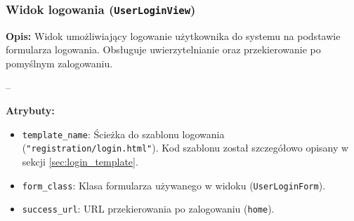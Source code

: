 \documentclass[12pt,a4paper,oneside]{article}
\theoremstyle{definition}
\numberwithin{equation}{section}
\begin{document}
\subsubsection*{Widok logowania (\texttt{UserLoginView})}

\textbf{Opis:}  
Widok umożliwiający logowanie użytkownika do systemu na podstawie formularza logowania. Obsługuje uwierzytelnianie oraz przekierowanie po pomyślnym zalogowaniu.

--

\textbf{Atrybuty:}
\begin{itemize}
    \item \texttt{template\_name}: Ścieżka do szablonu logowania (\texttt{"registration/login.html"}).
    \subsubitem Kod szablonu został szczegółowo opisany w sekcji \ref{sec:login_template}.
    
    \item \texttt{form\_class}: Klasa formularza używanego w widoku (\texttt{UserLoginForm}).
    \item \texttt{success\_url}: URL przekierowania po zalogowaniu (\texttt{home}).
\end{itemize}
\end{document}
